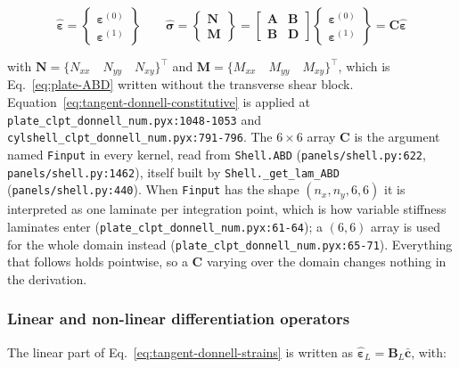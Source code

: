 \begin{equation}\label{eq:tangent-donnell-constitutive}
	\hat{\boldsymbol{\varepsilon}} = \left\{ \begin{matrix} \boldsymbol{\varepsilon}^{(0)} \\ \boldsymbol{\varepsilon}^{(1)} \end{matrix} \right\}
	\qquad
	\hat{\boldsymbol{\sigma}} = \left\{ \begin{matrix} \boldsymbol{N} \\ \boldsymbol{M} \end{matrix} \right\}
	= \begin{bmatrix} \boldsymbol{A} & \boldsymbol{B} \\ \boldsymbol{B} & \boldsymbol{D} \end{bmatrix}
	\left\{ \begin{matrix} \boldsymbol{\varepsilon}^{(0)} \\ \boldsymbol{\varepsilon}^{(1)} \end{matrix} \right\}
	= \boldsymbol{C} \hat{\boldsymbol{\varepsilon}}
\end{equation}

\noindent with $\boldsymbol{N} = \{N_{xx} \quad N_{yy} \quad N_{xy}\}^\top$ and $\boldsymbol{M} = \{M_{xx} \quad M_{yy} \quad M_{xy}\}^\top$, which is Eq.~\ref{eq:plate-ABD} written without the transverse shear block. Equation~\ref{eq:tangent-donnell-constitutive} is applied at \texttt{plate\_clpt\_donnell\_num.pyx:1048-1053} and \texttt{cylshell\_clpt\_donnell\_num.pyx:791-796}. The $6 \times 6$ array $\boldsymbol{C}$ is the argument named \texttt{Finput} in every kernel, read from \texttt{Shell.ABD} (\texttt{panels/shell.py:622}, \texttt{panels/shell.py:1462}), itself built by \texttt{Shell.\_get\_lam\_ABD} (\texttt{panels/shell.py:440}). When \texttt{Finput} has the shape $(n_x, n_y, 6, 6)$ it is interpreted as one laminate per integration point, which is how variable stiffness laminates enter (\texttt{plate\_clpt\_donnell\_num.pyx:61-64}); a $(6,6)$ array is used for the whole domain instead (\texttt{plate\_clpt\_donnell\_num.pyx:65-71}). Everything that follows holds pointwise, so a $\boldsymbol{C}$ varying over the domain changes nothing in the derivation.

\subsubsection{Linear and non-linear differentiation operators}

The linear part of Eq.~\ref{eq:tangent-donnell-strains} is written as $\hat{\boldsymbol{\varepsilon}}_L = \boldsymbol{B}_L \bar{\boldsymbol{c}}$, with:

